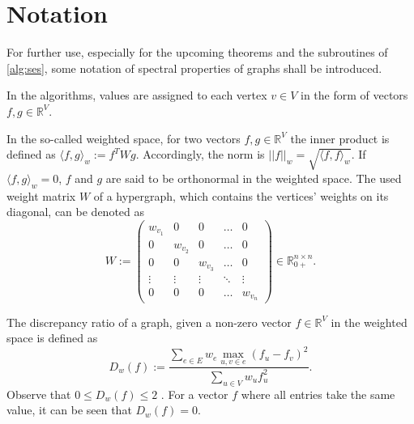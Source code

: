 \chapter{Notation}\label{chapter:notation}
For further use, especially for the upcoming theorems and the subroutines of \cref{alg:ses}, some notation of spectral properties of graphs shall be introduced.

In the algorithms, values are assigned to each vertex $v\in V$ in the form of vectors $f, g \in \mathbb{R}^V$. %

In the so-called weighted space, for two vectors $f, g \in \mathbb{R}^V$ the inner product is defined as $ \langle f,g \rangle_w := f^T W g$. Accordingly, the norm is $||f||_w = \sqrt{ \langle f,f \rangle_w}$.
If $ \langle f,g \rangle_w   = 0 $, $f$ and $g$ are said to be orthonormal in the weighted space. 
The used weight matrix $W$ of a hypergraph, which contains the vertices' weights on its diagonal, can be denoted as \begin{equation}
W := 
\begin{pmatrix}
w_{v_1} & 0 & 0&\dots &0 \\
0 & w_{v_2} & 0 & \ldots & 0 \\
0 & 0 & w_{v_3} & \ldots & 0 \\
\vdots & \vdots & \vdots & \ddots & \vdots \\
0 &0&0& \ldots  & w_{v_n}
\end{pmatrix} \in \mathbb{R}_{0+}^{n \times n} .
\end{equation} 

The discrepancy ratio of a graph, given a non-zero vector $f \in \mathbb{R}^V$ in the weighted space is defined as \begin{equation}\label{eq:discrepancy_ratio}
D_w(f) := \frac{\sum_{e\in E} w_e \max_{u,v\in e}(f_u - f_v)^2}{\sum_{u\in V} w_u f_u^2}.
\end{equation} 
Observe that $0\le D_w(f) \le 2 $ \cite{ChanLTZ16}. For a vector $f$ where all entries take the same value, it can be seen that $D_w(f) =0$.
 
